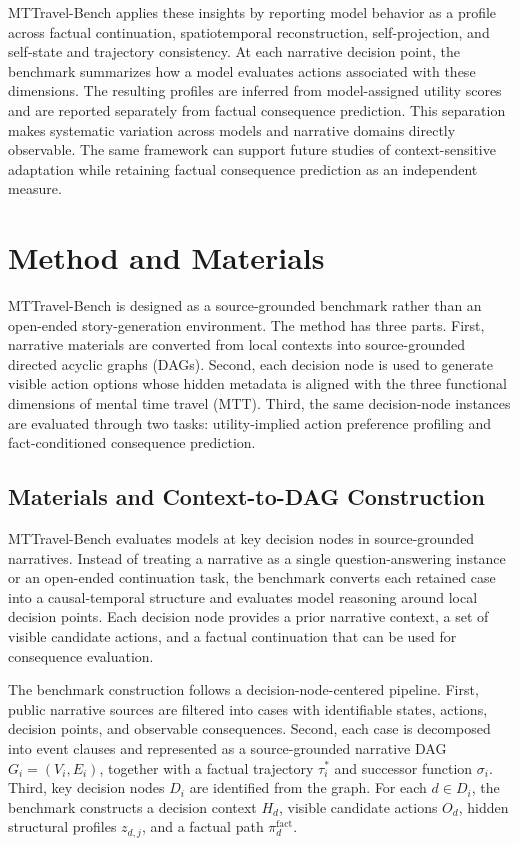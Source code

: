 \documentclass[pdflatex,sn-mathphys-num]{sn-jnl}%
\theoremstyle{thmstyleone}%
\theoremstyle{thmstyletwo}%
\theoremstyle{thmstylethree}%
\begin{document}
MTTravel-Bench applies these insights by reporting model behavior as a profile across factual continuation, spatiotemporal reconstruction, self-projection, and self-state and trajectory consistency. At each narrative decision point, the benchmark summarizes how a model evaluates actions associated with these dimensions. The resulting profiles are inferred from model-assigned utility scores and are reported separately from factual consequence prediction. This separation makes systematic variation across models and narrative domains directly observable. The same framework can support future studies of context-sensitive adaptation while retaining factual consequence prediction as an independent measure.

\section{Method and Materials}\label{sec3}\label{sec:mttravel-method}
MTTravel-Bench is designed as a source-grounded benchmark rather than an open-ended story-generation environment. The method has three parts. First, narrative materials are converted from local contexts into source-grounded directed acyclic graphs (DAGs). Second, each decision node is used to generate visible action options whose hidden metadata is aligned with the three functional dimensions of mental time travel (MTT). Third, the same decision-node instances are evaluated through two tasks: utility-implied action preference profiling and fact-conditioned consequence prediction.

\subsection{Materials and Context-to-DAG Construction}
MTTravel-Bench evaluates models at key decision nodes in source-grounded narratives. Instead of treating a narrative as a single question-answering instance or an open-ended continuation task, the benchmark converts each retained case into a causal-temporal structure and evaluates model reasoning around local decision points. Each decision node provides a prior narrative context, a set of visible candidate actions, and a factual continuation that can be used for consequence evaluation.

The benchmark construction follows a decision-node-centered pipeline. First, public narrative sources are filtered into cases with identifiable states, actions, decision points, and observable consequences. Second, each case is decomposed into event clauses and represented as a source-grounded narrative DAG $G_i=(V_i,E_i)$, together with a factual trajectory $\tau_i^{*}$ and successor function $\sigma_i$. Third, key decision nodes $D_i$ are identified from the graph. For each $d\in D_i$, the benchmark constructs a decision context $H_d$, visible candidate actions $O_d$, hidden structural profiles $z_{d,j}$, and a factual path $\pi_d^{\mathrm{fact}}$.
\end{document}
